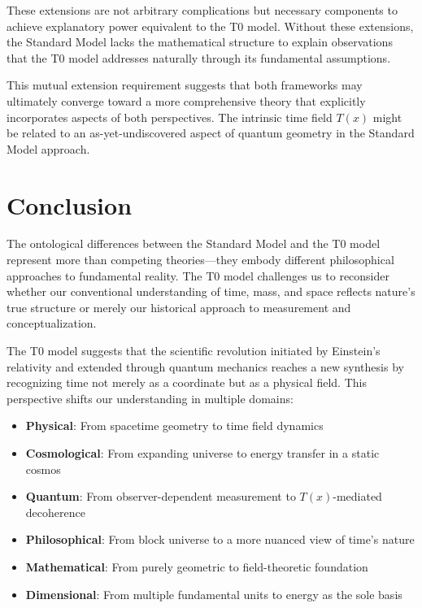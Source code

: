\documentclass[12pt,a4paper]{article}
\newcommand{\Tfield}{T(x)}
\begin{document}
	These extensions are not arbitrary complications but necessary components to achieve explanatory power equivalent to the T0 model. Without these extensions, the Standard Model lacks the mathematical structure to explain observations that the T0 model addresses naturally through its fundamental assumptions.
	
	This mutual extension requirement suggests that both frameworks may ultimately converge toward a more comprehensive theory that explicitly incorporates aspects of both perspectives. The intrinsic time field $\Tfield$ might be related to an as-yet-undiscovered aspect of quantum geometry in the Standard Model approach.
	
	\section{Conclusion}
	
	The ontological differences between the Standard Model and the T0 model represent more than competing theories—they embody different philosophical approaches to fundamental reality. The T0 model challenges us to reconsider whether our conventional understanding of time, mass, and space reflects nature's true structure or merely our historical approach to measurement and conceptualization.
	
	The T0 model suggests that the scientific revolution initiated by Einstein's relativity and extended through quantum mechanics reaches a new synthesis by recognizing time not merely as a coordinate but as a physical field. This perspective shifts our understanding in multiple domains:
	
	\begin{itemize}
		\item \textbf{Physical}: From spacetime geometry to time field dynamics
		\item \textbf{Cosmological}: From expanding universe to energy transfer in a static cosmos
		\item \textbf{Quantum}: From observer-dependent measurement to $\Tfield$-mediated decoherence
		\item \textbf{Philosophical}: From block universe to a more nuanced view of time's nature
		\item \textbf{Mathematical}: From purely geometric to field-theoretic foundation
		\item \textbf{Dimensional}: From multiple fundamental units to energy as the sole basis
	\end{itemize}
	
\end{document}
